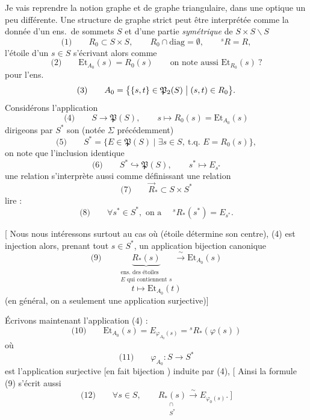 \documentclass[11pt,a4paper]{article}
\begin{document}
Je vais reprendre la notion  graphe et de graphe triangulaire, dans une
optique un peu différente. Une structure de graphe strict peut être interprétée
comme la donnée d'un ens.\ de sommets $S$ et d'une partie \emph{symétrique} de
$S \times S \smallsetminus S$
\[
\text{(1)} \qquad R_0 \subset S \times S , \qquad R_0 \cap \mathrm{diag} = \emptyset , \qquad {}^{s}R = R ,
\]
l'étoile d'un $s \in S$ s'écrivant alors comme
\[
\text{(2)} \qquad \mathrm{Et}_{A_0}(s) = R_0(s) \qquad \text{on note aussi } \mathrm{Et}_{R_0}(s) \ ?
\]
pour l'ens.
\[
\text{(3)} \qquad A_0 = \bigl\{ \{s,t\} \in \mathfrak{P}_2(S) \bigm| (s,t) \in R_0 \bigr\} .
\]
 Considérons l'application
\[
\text{(4)} \qquad S \longrightarrow \mathfrak{P}(S) , \qquad s \longmapsto R_0(s) = \mathrm{Et}_{A_0}(s)
\]
 dirigeons \struck{\ill{}} par $S^{*}$ son
 \struck{\ill{}} (notée $\Sigma$ précédemment)
\[
\text{(5)} \qquad S^{*} = \{ E \in \mathfrak{P}(S) \mid \exists s \in S ,\ \text{t.q. } E = R_0(s) \} ,
\]
on note que l'inclusion identique
\[
\text{(6)} \qquad S^{*} \hookrightarrow \mathfrak{P}(S) , \qquad
s^{*} \longmapsto E_{s^{*}}
\]
 une relation s'interprète aussi comme définissant une
relation
\[
\text{(7)} \qquad \vec{R}_{*} \subset S \times S^{*}
\]
lire :
\[
\text{(8)} \qquad \forall s^{*} \in S^{*} , \text{ on a } \quad {}^{s}R_{*}(s^{*}) = E_{s^{*}} .
\]

[ Nous nous intéressons surtout au cas où
 (étoile détermine son
centre), (4) est injection \struck{\ill{}} alors, prenant tout
$s \in S^{*}$, un \ill{} \struck{\ill{}} application bijection canonique
\[
\text{(9)} \qquad \underbrace{R_{*}(s)}_{\substack{\text{ens. des étoiles}\\ E \text{ qui contiennent } s}}
\xrightarrow{\ \sim\ } \mathrm{Et}_{A_0}(s)
\]
\[
t \longmapsto \mathrm{Et}_{A_0}(t)
\]
(en général, on a seulement une application surjective)]

 Écrivons maintenant  l'application (4)
:
\[
\text{(10)} \qquad \mathrm{Et}_{A_0}(s) = E_{\varphi_{A_0}(s)} = {}^{s}R_{*}(\varphi(s))
\]
où
\[
\text{(11)} \qquad \varphi_{A_0} : S \longrightarrow S^{*}
\]
est l'application surjective [en fait bijection  ) \ill{} induite par (4),
\struck{\ill{}}
[\struck{\ill{}} Ainsi la formule (9) s'écrit aussi
\[
\text{(12)} \qquad \forall s \in S , \qquad
\underset{\substack{\cap \\ S^{*}}}{R_{*}(s)} \xrightarrow{\ \sim\ } E_{\varphi_0(s)} .\ ]
\]
\end{document}
